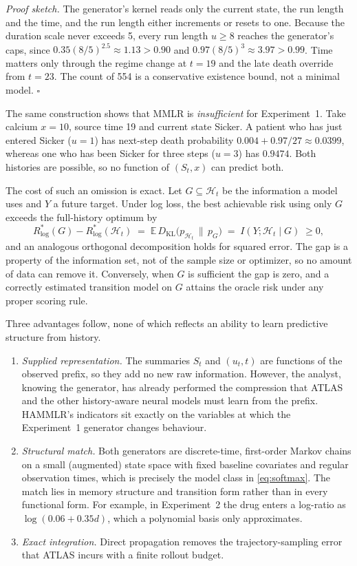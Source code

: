 \documentclass[11pt]{article}
\newcommand{\E}{\mathbb{E}}
\begin{document}
\noindent\emph{Proof sketch.} The generator's kernel reads only the current state, the run length and the time, and the run length either increments or resets to one. Because the duration scale never exceeds 5, every run length $u\ge 8$ reaches the generator's caps, since $0.35(8/5)^{2.5}\approx 1.13>0.90$ and $0.97(8/5)^{3}\approx 3.97>0.99$. Time matters only through the regime change at $t=19$ and the late death override from $t=23$. The count of 554 is a conservative existence bound, not a minimal model. $\square$

\medskip
The same construction shows that MMLR is \emph{insufficient} for Experiment~1. Take calcium $x=10$, source time 19 and current state Sicker. A patient who has just entered Sicker ($u=1$) has next-step death probability $0.004+0.97/27\approx 0.0399$, whereas one who has been Sicker for three steps ($u=3$) has $0.9474$. Both histories are possible, so no function of $(S_t,x)$ can predict both.

The cost of such an omission is exact. Let $G\subseteq\mathcal H_t$ be the information a model uses and $Y$ a future target. Under log loss, the best achievable risk using only $G$ exceeds the full-history optimum by
\begin{equation}
R^{*}_{\log}(G)-R^{*}_{\log}(\mathcal H_t)\;=\;\E\, D_{\mathrm{KL}}\!\big(p_{\mathcal H_t}\,\|\,p_G\big)\;=\;I(Y;\mathcal H_t\mid G)\;\ge 0 ,
\label{eq:info}
\end{equation}
and an analogous orthogonal decomposition holds for squared error. The gap is a property of the information set, not of the sample size or optimizer, so no amount of data can remove it. Conversely, when $G$ is sufficient the gap is zero, and a correctly estimated transition model on $G$ attains the oracle risk under any proper scoring rule.

Three advantages follow, none of which reflects an ability to learn predictive structure from history.
\begin{enumerate}
\item \emph{Supplied representation.} The summaries $S_t$ and $(u_t,t)$ are functions of the observed prefix, so they add no new raw information. However, the analyst, knowing the generator, has already performed the compression that ATLAS and the other history-aware neural models must learn from the prefix. HAMMLR's indicators sit exactly on the variables at which the Experiment~1 generator changes behaviour.
\item \emph{Structural match.} Both generators are discrete-time, first-order Markov chains on a small (augmented) state space with fixed baseline covariates and regular observation times, which is precisely the model class in \eqref{eq:softmax}. The match lies in memory structure and transition form rather than in every functional form. For example, in Experiment~2 the drug enters a log-ratio as $\log(0.06+0.35d)$, which a polynomial basis only approximates.
\item \emph{Exact integration.} Direct propagation removes the trajectory-sampling error that ATLAS incurs with a finite rollout budget.
\end{enumerate}
\end{document}
